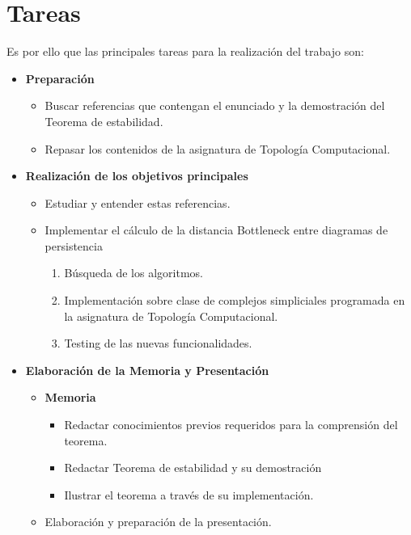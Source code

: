 \documentclass[a4paper, 12pt]{article}
\begin{document}
\section{Tareas}
Es por ello que las principales tareas para la realización del trabajo son:
\begin{itemize}
	\item \textbf{Preparación}
	\begin{itemize}
		\item Buscar referencias que contengan el enunciado y la demostración del Teorema de estabilidad.
		\item Repasar los contenidos de la asignatura de Topología Computacional.
	\end{itemize}
	
	\item \textbf{Realización de los objetivos principales}
	\begin{itemize}
		\item Estudiar y entender estas referencias.
		\item Implementar el cálculo de la distancia Bottleneck entre diagramas de persistencia
		\begin{enumerate}
			\item Búsqueda de los algoritmos.
			\item Implementación sobre clase de complejos simpliciales programada en la asignatura de Topología Computacional.
			\item Testing de las nuevas funcionalidades.
		\end{enumerate}
	\end{itemize}
	
	\item \textbf{Elaboración de la Memoria y Presentación}
	\begin{itemize}
		\item \textbf{Memoria}
		\begin{itemize}
			\item Redactar conocimientos previos requeridos para la comprensión del teorema.
			\item Redactar Teorema de estabilidad y su demostración
			\item Ilustrar el teorema a través de su implementación.
		\end{itemize}
		\item Elaboración y preparación de la presentación.
	\end{itemize}
	
\end{itemize}
\end{document}
